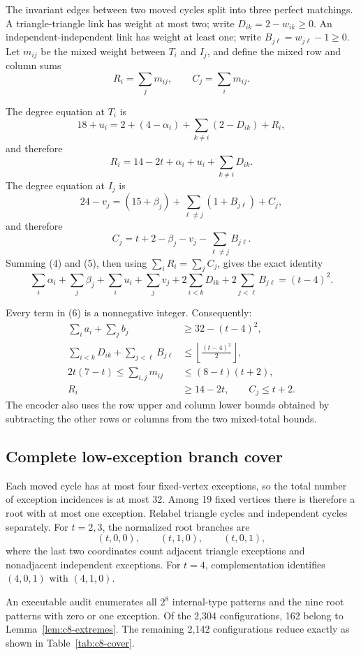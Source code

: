 \documentclass[11pt]{article}
\begin{document}
The invariant edges between two moved cycles split into three perfect
matchings. A triangle-triangle link has weight at most two; write
$D_{ik}=2-w_{ik}\ge0$. An independent-independent link has weight at least
one; write $B_{j\ell}=w_{j\ell}-1\ge0$. Let $m_{ij}$ be the mixed weight
between $T_i$ and $I_j$, and define the mixed row and column sums
\[
R_i=\sum_jm_{ij},\qquad C_j=\sum_im_{ij}.
\]

The degree equation at $T_i$ is
\[
18+u_i=2+(4-\alpha_i)
 +\sum_{k\ne i}(2-D_{ik})+R_i,
\]
and therefore
\[
R_i=14-2t+\alpha_i+u_i+\sum_{k\ne i}D_{ik}. \tag{4}
\]
The degree equation at $I_j$ is
\[
24-v_j=(15+\beta_j)
 +\sum_{\ell\ne j}(1+B_{j\ell})+C_j,
\]
and therefore
\[
C_j=t+2-\beta_j-v_j-\sum_{\ell\ne j}B_{j\ell}. \tag{5}
\]
Summing (4) and (5), then using $\sum_iR_i=\sum_jC_j$, gives the exact
identity
\[
\sum_i\alpha_i+\sum_j\beta_j+\sum_iu_i+\sum_jv_j
 +2\sum_{i<k}D_{ik}+2\sum_{j<\ell}B_{j\ell}
 =(t-4)^2. \tag{6}
\]

Every term in (6) is a nonnegative integer. Consequently:
\[
\begin{aligned}
\sum_i a_i+\sum_j b_j&\ge32-(t-4)^2,\\
\sum_{i<k}D_{ik}+\sum_{j<\ell}B_{j\ell}
 &\le\left\lfloor\frac{(t-4)^2}{2}\right\rfloor,\\
2t(7-t)\le\sum_{i,j}m_{ij}&\le(8-t)(t+2),\\
R_i&\ge14-2t,\qquad C_j\le t+2.
\end{aligned} \tag{7}
\]
The encoder also uses the row upper and column lower bounds obtained by
subtracting the other rows or columns from the two mixed-total bounds.

\subsection{Complete low-exception branch cover}

Each moved cycle has at most four fixed-vertex exceptions, so the total
number of exception incidences is at most 32. Among 19 fixed vertices there
is therefore a root with at most one exception. Relabel triangle cycles and
independent cycles separately. For $t=2,3$, the normalized root branches are
\[
(t,0,0),\qquad(t,1,0),\qquad(t,0,1),
\]
where the last two coordinates count adjacent triangle exceptions and
nonadjacent independent exceptions. For $t=4$, complementation identifies
$(4,0,1)$ with $(4,1,0)$.

An executable audit enumerates all $2^8$ internal-type patterns and the nine
root patterns with zero or one exception. Of the 2,304 configurations, 162
belong to Lemma~\ref{lem:c8-extremes}. The remaining 2,142 configurations
reduce exactly as shown in Table~\ref{tab:c8-cover}.
\end{document}
